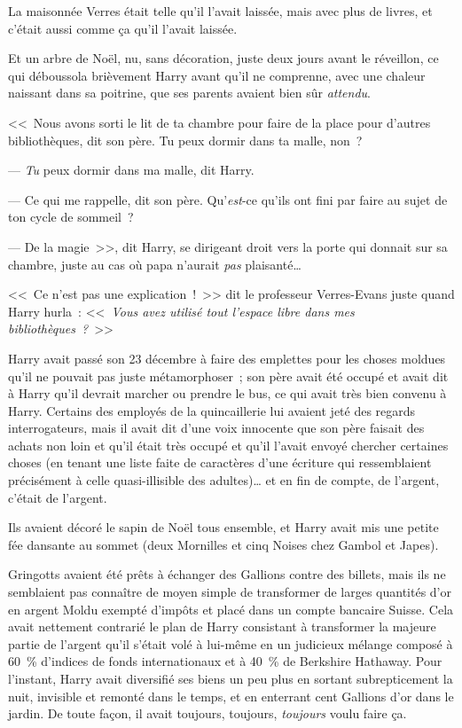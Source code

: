 La maisonnée Verres était telle qu'il l'avait laissée, mais avec plus de livres, et c'était aussi comme ça qu'il l'avait laissée.

Et un arbre de Noël, nu, sans décoration, juste deux jours avant le réveillon, ce qui déboussola brièvement Harry avant qu'il ne comprenne, avec une chaleur naissant dans sa poitrine, que ses parents avaient bien sûr \emph{attendu}.

<<~Nous avons sorti le lit de ta chambre pour faire de la place pour d'autres bibliothèques, dit son père. Tu peux dormir dans ta malle, non~?

--- \emph{Tu} peux dormir dans ma malle, dit Harry.

--- Ce qui me rappelle, dit son père. Qu'\emph{est}-ce qu'ils ont fini par faire au sujet de ton cycle de sommeil~?

--- De la magie~>>, dit Harry, se dirigeant droit vers la porte qui donnait sur sa chambre, juste au cas où papa n'aurait \emph{pas} plaisanté…

<<~Ce n'est pas une explication~!~>> dit le professeur Verres-Evans juste quand Harry hurla~: <<~\emph{Vous avez utilisé tout l'espace libre dans mes bibliothèques~?}~>>

\later

Harry avait passé son 23 décembre à faire des emplettes pour les choses moldues qu'il ne pouvait pas juste métamorphoser~; son père avait été occupé et avait dit à Harry qu'il devrait marcher ou prendre le bus, ce qui avait très bien convenu à Harry. Certains des employés de la quincaillerie lui avaient jeté des regards interrogateurs, mais il avait dit d'une voix innocente que son père faisait des achats non loin et qu'il était très occupé et qu'il l'avait envoyé chercher certaines choses (en tenant une liste faite de caractères d'une écriture qui ressemblaient précisément à celle quasi-illisible des adultes)… et en fin de compte, de l'argent, c'était de l'argent.

Ils avaient décoré le sapin de Noël tous ensemble, et Harry avait mis une petite fée dansante au sommet (deux Mornilles et cinq Noises chez Gambol et Japes).

Gringotts avaient été prêts à échanger des Gallions contre des billets, mais ils ne semblaient pas connaître de moyen simple de transformer de larges quantités d'or en argent Moldu exempté d'impôts et placé dans un compte bancaire Suisse. Cela avait nettement contrarié le plan de Harry consistant à transformer la majeure partie de l'argent qu'il s'était volé à lui-même en un judicieux mélange composé à 60~\% d'indices de fonds internationaux et à 40~\% de Berkshire Hathaway. Pour l'instant, Harry avait diversifié ses biens un peu plus en sortant subrepticement la nuit, invisible et remonté dans le temps, et en enterrant cent Gallions d'or dans le jardin. De toute façon, il avait toujours, toujours, \emph{toujours} voulu faire ça.

